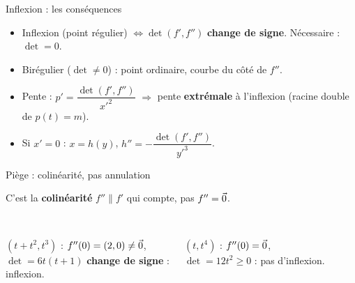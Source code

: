 \documentclass[aspectratio=169,11pt]{beamer}
\newcommand{\rep}[1]{\textcolor{Vert}{#1}}%
\begin{document}
\begin{frame}{Inflexion : les conséquences}
\begin{FORM}
\begin{itemize}
\item Inflexion (point régulier) $\iff\det(f',f'')$ \textbf{change de signe}. Nécessaire : $\det=0$.
\item Birégulier ($\det\neq0$) : point ordinaire, courbe du côté de $f''$.
\item Pente : $p'=\dfrac{\det(f',f'')}{x'^2}$ $\Rightarrow$ pente \textbf{extrémale} à l'inflexion (racine double de $p(t)=m$).
\item Si $x'=0$ : $x=h(y)$, $h''=-\dfrac{\det(f',f'')}{y'^3}$.
\end{itemize}
\end{FORM}
\end{frame}

\begin{frame}{Piège : colinéarité, pas annulation}
\begin{PIEGE}
C'est la \textbf{colinéarité} $f''\parallel f'$ qui compte, pas $f''=\vec{0}$.
\end{PIEGE}
\begin{columns}[T]
\centering
{}\\
$(t+t^2,t^3)$ : $f''(0)=(2,0)\neq\vec{0}$,\\ $\det=6t(t+1)$ \textbf{change de signe} :\\ \rep{inflexion}.
\centering
\pause
{}\\
$(t,t^4)$ : $f''(0)=\vec{0}$,\\ $\det=12t^2\geq0$ : \rep{pas d'inflexion}.
\end{columns}
\end{frame}
\end{document}
